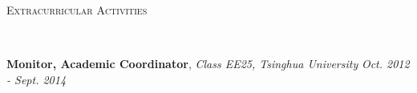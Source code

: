\documentclass[9pt]{article}
\newenvironment{changemargin}[2]{%
  \begin{list}{}{%
    \setlength{\topsep}{0pt}%
    \setlength{\leftmargin}{#1}%
    \setlength{\rightmargin}{#2}%
    \setlength{\listparindent}{\parindent}%
    \setlength{\itemindent}{\parindent}%
    \setlength{\parsep}{\parskip}%
  }%
  \item[]}{\end{list}
}
\newcommand{\lineover}{
	\begin{changemargin}{-0.05in}{-0.05in}
		\vspace*{-8pt}
		\hrulefill \\
		\vspace*{-2pt}
	\end{changemargin}
}
\newcommand{\header}[1]{
	\begin{changemargin}{-0.5in}{-0.5in}
		\scshape{#1}\\
  	\lineover
	\end{changemargin}
}
\newenvironment{body} {
	\vspace*{-16pt}
	\begin{changemargin}{-0.25in}{-0.5in}
  }	
	{\end{changemargin}
}
\begin{document}
\smallskip
\smallskip






\header{Extracurricular Activities}

\begin{body}
	\vspace{14pt}
	\textbf {Monitor, Academic Coordinator}, \emph{Class EE25, Tsinghua University} \hfill \emph{Oct. 2012 - Sept. 2014}\\


\end{body}

\smallskip
\smallskip
\end{document}

